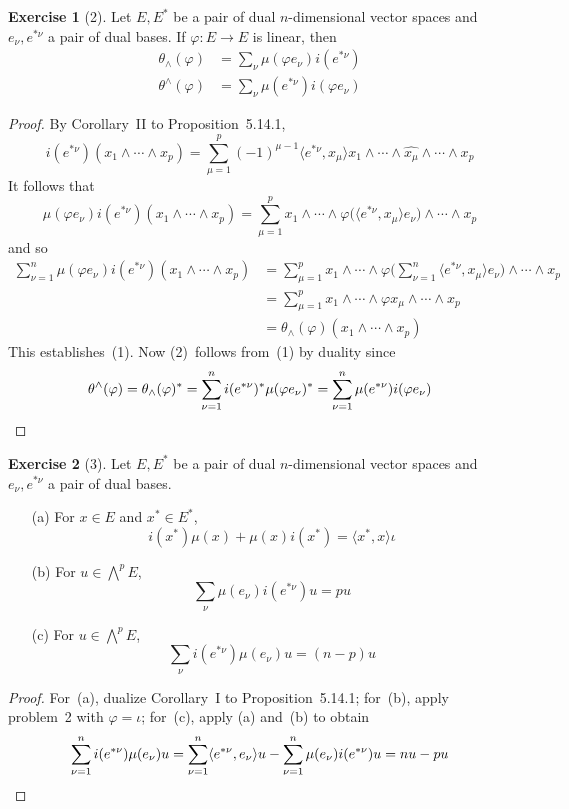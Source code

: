 \documentclass[letterpaper,12pt]{article}
\newcommand{\eprod}{\wedge}
\newcommand{\bigeprod}{\bigwedge}
\newcommand{\medeprod}{{\textstyle\bigeprod}}
\newcommand{\delete}{\widehat}
\newcommand{\sprod}[2]{\langle#1,#2\rangle}
\newcommand{\multi}[4]{#2_{#3}#1\cdots#1#2_{#4}}
\newcommand{\eprods}[3]{\multi{\eprod}{#1}{#2}{#3}}
\theoremstyle{definition}
\newtheorem*{exer}{Exercise}
\theoremstyle{remark}
\begin{document}
\begin{exer}[2]
Let \(E,E^*\) be a pair of dual \(n\)-dimensional vector spaces and \(e_{\nu},e^{*\nu}\) a pair of dual bases. If \(\varphi:E\to E\) is linear, then
\begin{align*}
\theta_{\eprod}(\varphi)&=\sum_{\nu}\mu(\varphi e_{\nu})i(e^{*\nu})\tag{1}\\
\theta^{\eprod}(\varphi)&=\sum_{\nu}\mu(e^{*\nu})i(\varphi e_{\nu})\tag{2}
\end{align*}
\end{exer}
\begin{proof}
By Corollary~II to Proposition~5.14.1,
\[i(e^{*\nu})(\eprods{x}{1}{p})=\sum_{\mu=1}^p(-1)^{\mu-1}\sprod{e^{*\nu}}{x_{\mu}}x_1\eprod\cdots\eprod\delete{x_{\mu}}\eprod\cdots\eprod x_p\]
It follows that
\[\mu(\varphi e_{\nu})i(e^{*\nu})(\eprods{x}{1}{p})=\sum_{\mu=1}^p x_1\eprod\cdots\eprod\varphi\bigl(\sprod{e^{*\nu}}{x_{\mu}}e_{\nu}\bigr)\eprod\cdots\eprod x_p\]
and so
\begin{align*}
\sum_{\nu=1}^n\mu(\varphi e_{\nu})i(e^{*\nu})(\eprods{x}{1}{p})&=\sum_{\mu=1}^p x_1\eprod\cdots\eprod\varphi\bigl(\sum_{\nu=1}^n\sprod{e^{*\nu}}{x_{\mu}}e_{\nu}\bigr)\eprod\cdots\eprod x_p\\
	&=\sum_{\mu=1}^p x_1\eprod\cdots\eprod\varphi x_{\mu}\eprod\cdots\eprod x_p\\
	&=\theta_{\eprod}(\varphi)(\eprods{x}{1}{p})
\end{align*}
This establishes~(1). Now (2)~follows from~(1) by duality since
\[\theta^{\eprod}(\varphi)=\theta_{\eprod}(\varphi)^*=\sum_{\nu=1}^n i(e^{*\nu})^*\mu(\varphi e_{\nu})^*=\sum_{\nu=1}^n\mu(e^{*\nu})i(\varphi e_{\nu})\qedhere\]
\end{proof}

\begin{exer}[3]
Let \(E,E^*\) be a pair of dual \(n\)-dimensional vector spaces and \(e_{\nu},e^{*\nu}\) a pair of dual bases.
\begin{enumerate}
\item[(a)] For \(x\in E\) and \(x^*\in E^*\),
\[i(x^*)\mu(x)+\mu(x)i(x^*)=\sprod{x^*}{x}\iota\]
\item[(b)] For \(u\in\medeprod^p E\),
\[\sum_{\nu}\mu(e_{\nu})i(e^{*\nu})u=pu\]
\item[(c)] For \(u\in\medeprod^p E\),
\[\sum_{\nu}i(e^{*\nu})\mu(e_{\nu})u=(n-p)u\]
\end{enumerate}
\end{exer}
\begin{proof}
For~(a), dualize Corollary~I to Proposition~5.14.1; for~(b), apply problem~2 with \(\varphi=\iota\); for~(c), apply (a) and~(b) to obtain
\[\sum_{\nu=1}^n i(e^{*\nu})\mu(e_{\nu})u=\sum_{\nu=1}^n\sprod{e^{*\nu}}{e_{\nu}}u-\sum_{\nu=1}^n\mu(e_{\nu})i(e^{*\nu})u=nu-pu\qedhere\]
\end{proof}
\end{document}
